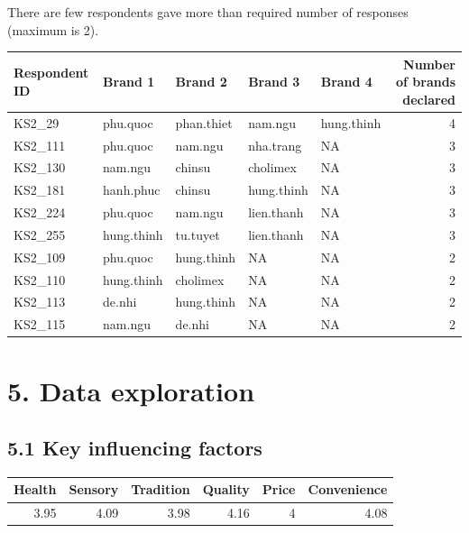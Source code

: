 \documentclass[]{article}
\begin{document}
There are few respondents gave more than required number of responses
(maximum is 2).

\begin{tabular}{lllllr}
\toprule
\textbf{Respondent ID} & \textbf{Brand 1} & \textbf{Brand 2} & \textbf{Brand 3} & \textbf{Brand 4} & \textbf{Number of brands declared}\\
\midrule
KS2_29 & phu.quoc & phan.thiet & nam.ngu & hung.thinh & 4\\
KS2_111 & phu.quoc & nam.ngu & nha.trang & NA & 3\\
KS2_130 & nam.ngu & chinsu & cholimex & NA & 3\\
KS2_181 & hanh.phuc & chinsu & hung.thinh & NA & 3\\
KS2_224 & phu.quoc & nam.ngu & lien.thanh & NA & 3\\
\addlinespace
KS2_255 & hung.thinh & tu.tuyet & lien.thanh & NA & 3\\
KS2_109 & phu.quoc & hung.thinh & NA & NA & 2\\
KS2_110 & hung.thinh & cholimex & NA & NA & 2\\
KS2_113 & de.nhi & hung.thinh & NA & NA & 2\\
KS2_115 & nam.ngu & de.nhi & NA & NA & 2\\
\bottomrule
\end{tabular}

\hypertarget{data-exploration}{%
\section{5. Data exploration}\label{data-exploration}}

\hypertarget{key-influencing-factors}{%
\subsection{5.1 Key influencing factors}\label{key-influencing-factors}}

\begin{tabular}{rrrrrr}
\toprule
\textbf{Health} & \textbf{Sensory} & \textbf{Tradition} & \textbf{Quality} & \textbf{Price} & \textbf{Convenience}\\
\midrule
3.95 & 4.09 & 3.98 & 4.16 & 4 & 4.08\\
\bottomrule
\end{tabular}
\end{document}

